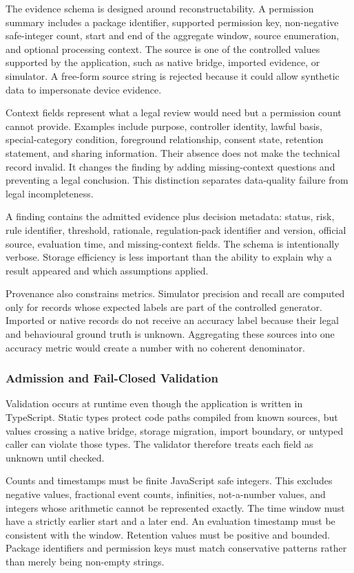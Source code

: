 The evidence schema is designed around reconstructability. A permission summary includes a package identifier, supported permission key, non-negative safe-integer count, start and end of the aggregate window, source enumeration, and optional processing context. The source is one of the controlled values supported by the application, such as native bridge, imported evidence, or simulator. A free-form source string is rejected because it could allow synthetic data to impersonate device evidence.

Context fields represent what a legal review would need but a permission count cannot provide. Examples include purpose, controller identity, lawful basis, special-category condition, foreground relationship, consent state, retention statement, and sharing information. Their absence does not make the technical record invalid. It changes the finding by adding missing-context questions and preventing a legal conclusion. This distinction separates data-quality failure from legal incompleteness.

A finding contains the admitted evidence plus decision metadata: status, risk, rule identifier, threshold, rationale, regulation-pack identifier and version, official source, evaluation time, and missing-context fields. The schema is intentionally verbose. Storage efficiency is less important than the ability to explain why a result appeared and which assumptions applied.

Provenance also constrains metrics. Simulator precision and recall are computed only for records whose expected labels are part of the controlled generator. Imported or native records do not receive an accuracy label because their legal and behavioural ground truth is unknown. Aggregating these sources into one accuracy metric would create a number with no coherent denominator.

\subsubsection{Admission and Fail-Closed Validation}

Validation occurs at runtime even though the application is written in TypeScript. Static types protect code paths compiled from known sources, but values crossing a native bridge, storage migration, import boundary, or untyped caller can violate those types. The validator therefore treats each field as unknown until checked.

Counts and timestamps must be finite JavaScript safe integers. This excludes negative values, fractional event counts, infinities, not-a-number values, and integers whose arithmetic cannot be represented exactly. The time window must have a strictly earlier start and a later end. An evaluation timestamp must be consistent with the window. Retention values must be positive and bounded. Package identifiers and permission keys must match conservative patterns rather than merely being non-empty strings.

